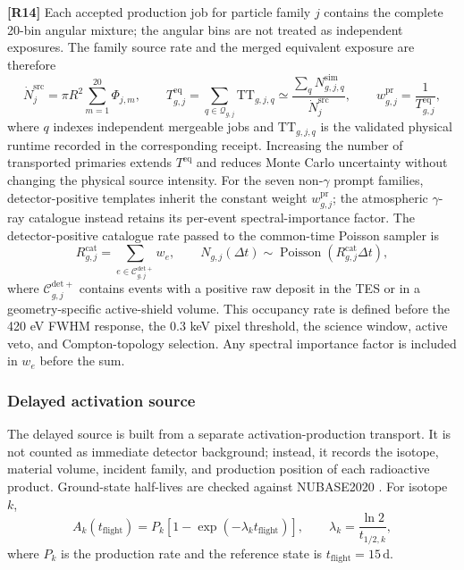 \documentclass[11pt]{article}
\newcommand{\revblue}[1]{\textcolor{revisionblue}{#1}}
\begin{document}
\begingroup
\color{revisionblue}
\noindent\textbf{[R14]} Each accepted production job for particle family $j$
contains the complete 20-bin angular mixture; the angular bins are not treated
as independent exposures. The family source rate and the merged equivalent
exposure are therefore
\begin{equation}
 \dot N^{\mathrm{src}}_{j}=\pi R^2\sum_{m=1}^{20}\Phi_{j,m},
 \qquad
 T^{\mathrm{eq}}_{g,j}=\sum_{q\in\mathcal Q_{g,j}}\mathrm{TT}_{g,j,q}
 \simeq
 \frac{\sum_q N^{\mathrm{sim}}_{g,j,q}}{\dot N^{\mathrm{src}}_{j}},
 \qquad
 w^{\mathrm{pr}}_{g,j}=\frac{1}{T^{\mathrm{eq}}_{g,j}},
 \label{eq:prompt_equivalent_exposure}
\end{equation}
where $q$ indexes independent mergeable jobs and $\mathrm{TT}_{g,j,q}$ is the
validated physical runtime recorded in the corresponding receipt. Increasing
the number of transported primaries extends $T^{\mathrm{eq}}$ and reduces Monte
Carlo uncertainty without changing the physical source intensity. For the
seven non-$\gamma$ prompt families, detector-positive templates inherit the
constant weight $w^{\mathrm{pr}}_{g,j}$; the \revblue{atmospheric $\gamma$-ray catalogue} instead
retains its per-event spectral-importance factor. The detector-positive
catalogue rate passed to the common-time Poisson sampler is
\begin{equation}
 R^{\mathrm{cat}}_{g,j}=\sum_{e\in\mathcal C^{\mathrm{det+}}_{g,j}}w_e,
 \qquad
 N_{g,j}(\Delta t)\sim
 \operatorname{Poisson}\!\left(R^{\mathrm{cat}}_{g,j}\Delta t\right),
 \label{eq:catalog_poisson_rate}
\end{equation}
where $\mathcal C^{\mathrm{det+}}_{g,j}$ contains events with a positive raw
deposit in the TES or in a geometry-specific active-shield volume. This occupancy rate is
defined before the 420 eV FWHM response, the 0.3 keV pixel threshold, the
science window, active veto, and Compton-topology selection. Any spectral
importance factor is included in $w_e$ before the sum.
\endgroup

\subsubsection{Delayed activation source}
\label{subsec:delayed_source}

The delayed source is built from a separate activation-production transport. It
is not counted as immediate detector background; instead, it records the isotope,
material volume, incident family, and production position of each radioactive
product. Ground-state half-lives are checked against NUBASE2020
\cite{Kondev2021NUBASE}. For isotope $k$,
\begin{equation}
  A_k(t_{\mathrm{flight}})=P_k\left[1-\exp(-\lambda_k t_{\mathrm{flight}})\right],
  \qquad \lambda_k=\frac{\ln2}{t_{1/2,k}},
\end{equation}
where $P_k$ is the production rate and the reference state is
$t_{\mathrm{flight}}=15\,\mathrm{d}$.
\end{document}
